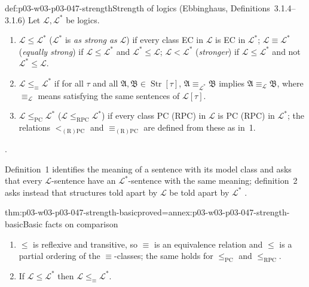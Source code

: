 \begin{hbdefinition}{def:p03-w03-p03-047-strength}{Strength of logics (Ebbinghaus, Definitions~3.1.4--3.1.6)}
Let \(\mathscr L,\mathscr L^*\) be logics.
\begin{enumerate}
 \item \(\mathscr L\le\mathscr L^*\) (\(\mathscr L^*\) is \emph{as strong as}
       \(\mathscr L\)) if every class EC in \(\mathscr L\) is EC in
       \(\mathscr L^*\); \(\mathscr L\equiv\mathscr L^*\) (\emph{equally
       strong}) if \(\mathscr L\le\mathscr L^*\) and \(\mathscr L^*\le\mathscr L\);
       \(\mathscr L<\mathscr L^*\) (\emph{stronger}) if \(\mathscr L\le\mathscr L^*\)
       and not \(\mathscr L^*\le\mathscr L\).
 \item \(\mathscr L\le_{\equiv}\mathscr L^*\) if for all \(\tau\) and all
       \(\mathfrak A,\mathfrak B\in\operatorname{Str}[\tau]\),
       \(\mathfrak A\equiv_{\mathscr L^*}\mathfrak B\) implies
       \(\mathfrak A\equiv_{\mathscr L}\mathfrak B\), where
       \(\equiv_{\mathscr L}\) means satisfying the same sentences of
       \(\mathscr L[\tau]\).
 \item \(\mathscr L\le_{\mathrm{PC}}\mathscr L^*\)
       (\(\mathscr L\le_{\mathrm{RPC}}\mathscr L^*\)) if every class PC
       (RPC) in \(\mathscr L\) is PC (RPC) in \(\mathscr L^*\); the relations
       \(<_{(\mathrm R)\mathrm{PC}}\) and \(\equiv_{(\mathrm R)\mathrm{PC}}\)
       are defined from these as in~1.
\end{enumerate}
\cite[Ch.~II, Definitions~3.1.4--3.1.6, p.~43]{Ebbinghaus1985ExtendedLogics}.
\end{hbdefinition}

Definition~1 identifies the meaning of a sentence with its model class and
asks that every \(\mathscr L\)-sentence have an \(\mathscr L^*\)-sentence
with the same meaning; definition~2 asks instead that structures told apart
by \(\mathscr L\) be told apart by \(\mathscr L^*\)
\cite[Ch.~II, \S3.1, pp.~42--43]{Ebbinghaus1985ExtendedLogics}.

\begin{hbtheorem}{thm:p03-w03-p03-047-strength-basic}{proved=annex:p03-w03-p03-047-strength-basic}{Basic facts on comparison}
\begin{enumerate}
 \item \(\le\) is reflexive and transitive, so \(\equiv\) is an equivalence
       relation and \(\le\) is a partial ordering of the
       \(\equiv\)-classes; the same holds for \(\le_{\mathrm{PC}}\) and
       \(\le_{\mathrm{RPC}}\).
 \item If \(\mathscr L\le\mathscr L^*\) then
       \(\mathscr L\le_{\equiv}\mathscr L^*\).
\end{enumerate}
\end{hbtheorem}

